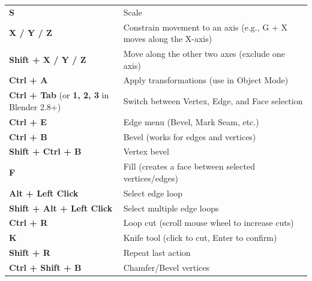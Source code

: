\documentclass{article}
\begin{document}
\begin{longtable}{ll}
    \textbf{S}                                                & Scale                                                              \\
    \textbf{X / Y / Z}                                        & Constrain movement to an axis (e.g., G + X moves along the X-axis) \\
    \textbf{Shift + X / Y / Z}                                & Move along the other two axes (exclude one axis)                   \\
    \textbf{Ctrl + A}                                         & Apply transformations (use in Object Mode)                         \\
    \midrule
    \textbf{Ctrl + Tab} (or \textbf{1, 2, 3} in Blender 2.8+) & Switch between Vertex, Edge, and Face selection                    \\
    \textbf{Ctrl + E}                                         & Edge menu (Bevel, Mark Seam, etc.)                                 \\
    \textbf{Ctrl + B}                                         & Bevel (works for edges and vertices)                               \\
    \textbf{Shift + Ctrl + B}                                 & Vertex bevel                                                       \\
    \textbf{F}                                                & Fill (creates a face between selected vertices/edges)              \\
    \textbf{Alt + Left Click}                                 & Select edge loop                                                   \\
    \textbf{Shift + Alt + Left Click}                         & Select multiple edge loops                                         \\
    \midrule
    \textbf{Ctrl + R}                                         & Loop cut (scroll mouse wheel to increase cuts)                     \\
    \textbf{K}                                                & Knife tool (click to cut, Enter to confirm)                        \\
    \textbf{Shift + R}                                        & Repeat last action                                                 \\
    \textbf{Ctrl + Shift + B}                                 & Chamfer/Bevel vertices                                             \\
\end{longtable}
\end{document}
